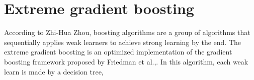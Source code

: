 \section{Extreme gradient boosting}
\label{sec:XGBoost}

According to Zhi-Hua Zhou\cite{zhou2012ensemble}, boosting algorithms are a group of algorithms that sequentially applies weak learners to achieve strong learning by the end. The extreme gradient boosting\cite{chen2016xgboost} is an optimized implementation of the gradient boosting framework proposed by Friedman et al.\cite{friedman2000additive},\cite{friedman2001greedy}. In this algorithm, each weak learn is made by a decision tree,